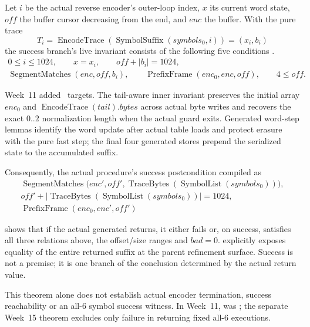 Let \(i\) be the actual reverse encoder's outer-loop index, \(x\) its current
word state, \(off\) the buffer cursor decreasing from the end, and \(enc\) the
buffer. With the pure trace
\[
  T_i=\operatorname{EncodeTrace}
       (\operatorname{SymbolSuffix}(symbols_0,i))=(x_i,b_i)
\]
the success branch's live invariant consists of the following five conditions
\cite{rans-encoder-invariant}.
\[
\begin{gathered}
  0\le i\le1024,\qquad x=x_i,\qquad off+|b_i|=1024,\\
  \operatorname{SegmentMatches}(enc,off,b_i),\qquad
  \operatorname{PrefixFrame}(enc_0,enc,off),\qquad 4\le off.
\end{gathered}
\]

Week~11 added \WeekElevenTargetCount\ targets. The tail-aware inner invariant
preserves the initial array \(enc_0\) and
\(\operatorname{EncodeTrace}(tail).bytes\) across actual byte writes and recovers
the exact \(0..2\) normalization length when the actual guard exits. Generated
word-step lemmas identify the word update after actual table loads and protect
erasure with the pure fast step; the final four generated stores prepend the
serialized state to the accumulated suffix.

Consequently, the actual procedure's success postcondition compiled as
\[
\begin{gathered}
  \operatorname{SegmentMatches}
  \bigl(enc',off',\operatorname{TraceBytes}
  (\operatorname{SymbolList}(symbols_0))\bigr),\\
  off'+\left|\operatorname{TraceBytes}
  (\operatorname{SymbolList}(symbols_0))\right|=1024,\\
  \operatorname{PrefixFrame}(enc_0,enc',off')
\end{gathered}
\]

\begin{verified}
 shows that if the actual generated
 returns, it either fails or, on success, satisfies all
three relations above, the offset/size ranges and \(bad=0\).
 explicitly exposes equality of
the entire returned suffix at the parent refinement surface. Success is not a
premise; it is one branch of the conclusion determined by the actual return value.
\end{verified}

\begin{caution}
This theorem alone does not establish actual encoder termination, success
reachability or an all-6 symbol success witness. In Week~11,
 was \statuspartial; the separate
Week~15 theorem excludes only failure in returning fixed all-6 executions.
\end{caution}

